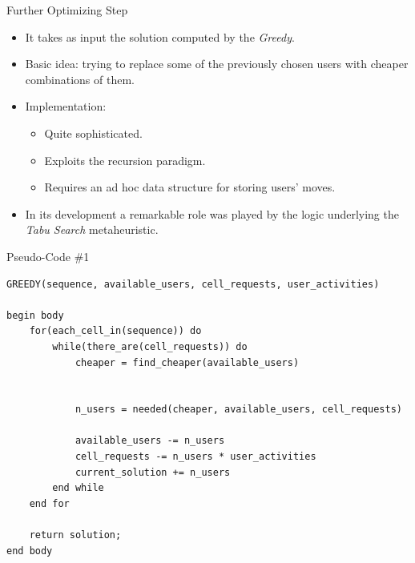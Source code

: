 \documentclass[]{beamer}
\newcommand{\hl}[1]{{\color[HTML]{26BF18} #1}}
\begin{document}
\begin{frame} {\fontUbuntu Further Optimizing Step}
	\begin{itemize}
		\item It takes as input the solution computed by the \textit{Greedy}.
		\item Basic idea: trying to \hl{replace} some of the previously chosen users with \hl{cheaper combinations} of them.
		\item Implementation: 
			\begin{itemize}
				\item Quite sophisticated.
				\item Exploits the \hl{recursion} paradigm.
				\item Requires an \hl{ad hoc data structure} for storing users' moves.
			\end{itemize}
		\item In its development a remarkable role was played by the logic underlying the \textit{Tabu Search} metaheuristic.
	\end{itemize}
\end{frame}

\begin{frame}[fragile]{\fontUbuntu Pseudo-Code \#1}
	\begin{lstlisting}
GREEDY(sequence, available_users, cell_requests, user_activities) 
    
begin body                      	
	for(each_cell_in(sequence)) do                      		
		while(there_are(cell_requests)) do
			cheaper = find_cheaper(available_users)
		
							
			n_users = needed(cheaper, available_users, cell_requests)
							
			available_users -= n_users
			cell_requests -= n_users * user_activities
			current_solution += n_users 
		end while                      		
	end for

	return solution;
end body
	\end{lstlisting}
\end{frame}

%
%			
%					
%		
\end{document}
